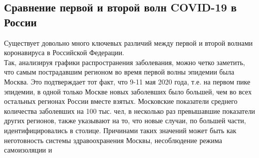 \documentclass[a4paper, 12pt]{extarticle}
\begin{document}
\newpage

\subsection{Сравнение первой и второй волн COVID-19 в России}
Существует довольно много ключевых различий между первой и второй волнами коронавируса в Российской Федерации.
\\

Так, анализируя графики распространения заболевания, можно четко заметить, что самым пострадавшим регионом во время первой волны эпидемии была Москва. Это подтверждает тот факт, что 9-11 мая 2020 года, т.е. на первом пике эпидемии, в одной только Москве новых заболевших было большей, чем во всех остальных регионах России вместе взятых. Московские показатели среднего количества заболевших на 100 тыс. чел, в несколько раз превышавшие показатели других регионов, также указывают на то, что новые случаи, по большей части, идентифицировались в столице. Причинами таких значений может быть как неготовность системы здравоохранения Москвы, несоблюдение режима самоизоляции и

\newpage


{}

\end{document}
